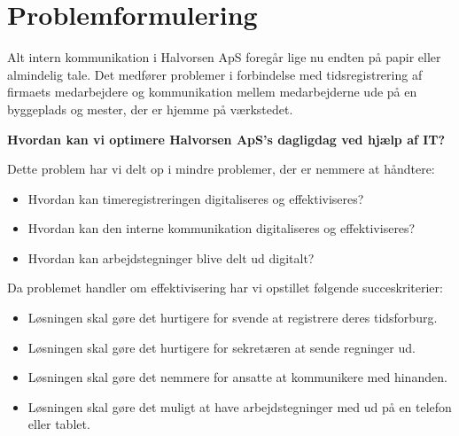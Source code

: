 \section{Problemformulering} \label{problemformulering}

Alt intern kommunikation i Halvorsen ApS foregår lige nu endten på papir eller almindelig tale. Det medfører problemer i forbindelse med tidsregistrering af firmaets medarbejdere og kommunikation mellem medarbejderne ude på en byggeplads og mester, der er hjemme på værkstedet.

\textbf{Hvordan kan vi optimere Halvorsen ApS's dagligdag ved hjælp af IT?}

Dette problem har vi delt op i mindre problemer, der er nemmere at håndtere:
\begin{itemize}
    \item Hvordan kan timeregistreringen digitaliseres og effektiviseres?
    \item Hvordan kan den interne kommunikation digitaliseres og effektiviseres?
    \item Hvordan kan arbejdstegninger blive delt ud digitalt?
\end{itemize}

Da problemet handler om effektivisering har vi opstillet følgende succeskriterier:

\begin{itemize}
    \item Løsningen skal gøre det hurtigere for svende at registrere deres tidsforburg.
    \item Løsningen skal gøre det hurtigere for sekretæren at sende regninger ud.
    \item Løsningen skal gøre det nemmere for ansatte at kommunikere med hinanden.
    \item Løsningen skal gøre det muligt at have arbejdstegninger med ud på en telefon eller tablet.
\end{itemize}